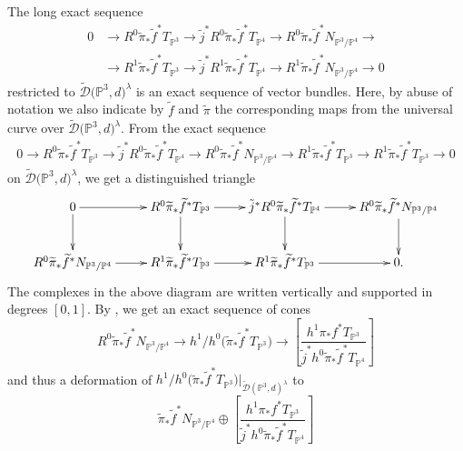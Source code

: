 \documentclass[pdftex]{sigma}
\numberwithin{equation}{section}
\newcommand{\PP}{\mathbb P}
\theoremstyle{plain}
\theoremstyle{definition}
\theoremstyle{remark}
\begin{document}
\begin{Remark}
The long exact sequence
\begin{align*}0& \to R^0\widetilde{\pi}_*\widetilde{f}^*T_{\PP^3}\to \tilde{j}^*R^0\widetilde{\pi}_*\widetilde{f}^*T_{\PP^4}\to R^0\widetilde{\pi}_*\widetilde{f}^*N_{\PP^3/\PP^4}\to \\
& \to R^1\widetilde{\pi}_*\widetilde{f}^*T_{\PP^3}\to \tilde{j}^* R^1\widetilde{\pi}_*\widetilde{f}^*T_{\PP^4}\to R^1\widetilde{\pi}_*\widetilde{f}^*N_{\PP^3/\PP^4}\to 0
\end{align*}
restricted to $\widetilde{\mathcal{D}}\big(\PP^3,d\big)^{\lambda}$ is an exact sequence of vector bundles. Here, by abuse of notation we also indicate by $\widetilde{f}$ and $\widetilde{\pi}$ the corresponding maps from the universal curve over $\widetilde{\mathcal{D}}\big(\PP^3,d\big)^{\lambda}$. From the exact sequence
\begin{align*}0\to R^0\widetilde{\pi}_*\widetilde{f}^*T_{\PP^3}\to \tilde{j}^*R^0\widetilde{\pi}_*\widetilde{f}^*T_{\PP^4}\to R^0\widetilde{\pi}_*\widetilde{f}^*N_{\PP^3/\PP^4}
\to R^1\widetilde{\pi}_*\widetilde{f}^*T_{\PP^3}\to R^1\widetilde{\pi}_*\widetilde{f}^*T_{\PP^3}\to 0
\end{align*}
on $\widetilde{\mathcal{D}}\big(\PP^3,d\big)^{\lambda}$, we get a distinguished triangle
\[ \begin{xymatrix}{0\ar[r]\ar[d]&
R^{0}\widetilde{\pi}_*\widetilde{f}^*T_{\PP^3}\ar[r]\ar[d]& \tilde{j}^*R^{0}\widetilde{\pi}_*\widetilde{f}^*T_{\PP^4}\ar[r]\ar[d]&R^{0}\widetilde{\pi}_*\widetilde{f}^*N_{\PP^3/\PP^4}\ar[d]\\
R^{0}\widetilde{\pi}_*\widetilde{f}^*N_{\PP^3/\PP^4}\ar[r]&R^{1}\widetilde{\pi}_*\widetilde{f}^*T_{\PP^3}\ar[r]&R^{1}\widetilde{\pi}_*\widetilde{f}^*T_{\PP^3}\ar[r]&0
.}
\end{xymatrix}
\]
The complexes in the above diagram are written vertically and supported in degrees $[0,1]$. By \cite[Proposition~2.7]{BerFan}, we get an exact sequence of cones
\[R^{0}\widetilde{\pi}_*\widetilde{f}^*N_{\PP^3/\PP^4}\to
h^1/h^0\big(\widetilde{\pi}_*\widetilde{f}^*T_{\PP^3}\big)\to \left[\frac{h^1\pi_*f^*T_{\PP^3}}{\tilde{j}^*h^0\widetilde{\pi}_*\widetilde{f}^*T_{\PP^4}}\right]
\]
and thus a deformation of $h^1/h^0\big(\widetilde{\pi}_*\widetilde{f}^*T_{\PP^3}\big)|_{\widetilde{\mathcal{D}}(\PP^3,d)^{\lambda}}$ to
\begin{equation}\label{limvbstack}\widetilde{\pi}_*\tilde{f}^*N_{\PP^3/\PP^4}\oplus \left[\frac{h^1\pi_*f^*T_{\PP^3}}{\tilde{j}^*h^0\widetilde{\pi}_*\widetilde{f}^*T_{\PP^4}}\right]
\end{equation}

\end{Remark}
\end{document}
